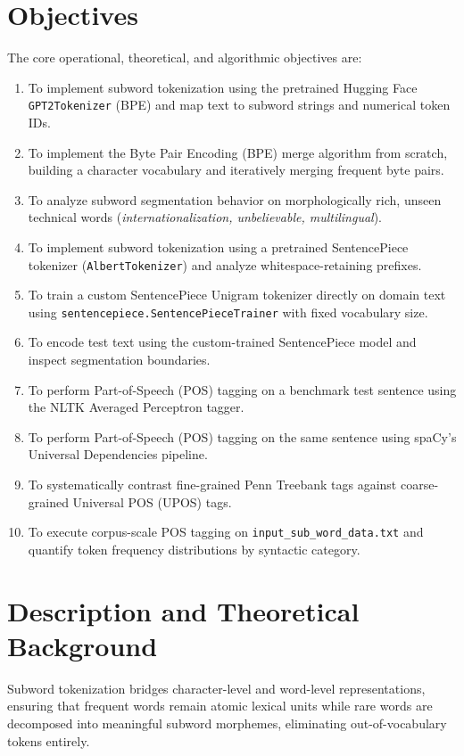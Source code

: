 \section{Objectives}
The core operational, theoretical, and algorithmic objectives are:
\begin{enumerate}[label=\textbf{\arabic*.}]
    \item To implement subword tokenization using the pretrained Hugging Face \texttt{GPT2Tokenizer} (BPE) and map text to subword strings and numerical token IDs.
    \item To implement the Byte Pair Encoding (BPE) merge algorithm from scratch, building a character vocabulary and iteratively merging frequent byte pairs.
    \item To analyze subword segmentation behavior on morphologically rich, unseen technical words (\textit{internationalization, unbelievable, multilingual}).
    \item To implement subword tokenization using a pretrained SentencePiece tokenizer (\texttt{AlbertTokenizer}) and analyze whitespace-retaining prefixes.
    \item To train a custom SentencePiece Unigram tokenizer directly on domain text using \texttt{sentencepiece.SentencePieceTrainer} with fixed vocabulary size.
    \item To encode test text using the custom-trained SentencePiece model and inspect segmentation boundaries.
    \item To perform Part-of-Speech (POS) tagging on a benchmark test sentence using the NLTK Averaged Perceptron tagger.
    \item To perform Part-of-Speech (POS) tagging on the same sentence using spaCy's Universal Dependencies pipeline.
    \item To systematically contrast fine-grained Penn Treebank tags against coarse-grained Universal POS (UPOS) tags.
    \item To execute corpus-scale POS tagging on \texttt{input\_sub\_word\_data.txt} and quantify token frequency distributions by syntactic category.
\end{enumerate}

\section{Description and Theoretical Background}
Subword tokenization bridges character-level and word-level representations, ensuring that frequent words remain atomic lexical units while rare words are decomposed into meaningful subword morphemes, eliminating out-of-vocabulary tokens entirely.

